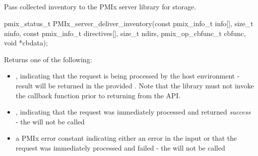 \subsection{}

\summary

Pass collected inventory to the \ac{PMIx} server library for storage.

\format

\cspecificstart
\begin{codepar}
pmix_status_t
PMIx_server_deliver_inventory(const pmix_info_t info[],
                              size_t ninfo,
                              const pmix_info_t directives[],
                              size_t ndirs,
                              pmix_op_cbfunc_t cbfunc,
                              void *cbdata);
\end{codepar}
\cspecificend

\begin{arglist}
\end{arglist}

Returns one of the following:

\begin{itemize}
    \item {}, indicating that the request is being processed by the host environment - result will be returned in the provided . Note that the library must not invoke the callback function prior to returning from the \ac{API}.
    \item {}, indicating that the request was immediately processed and returned \textit{success} - the  will not be called
    \item a PMIx error constant indicating either an error in the input or that the request was immediately processed and failed - the  will not be called
\end{itemize}


